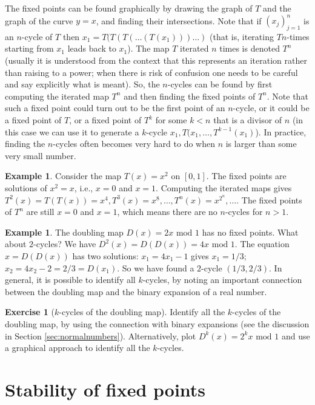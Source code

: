 \documentclass[11pt]{report}
\theoremstyle{plain}
\theoremstyle{definition}
\newtheorem{example}[thm]{Example}
\newtheorem{xexercise}[thm]{Exercise}
\begin{document}
The fixed points can be found graphically by drawing
the graph of $T$ and the graph of the curve $y=x$, and
finding their intersections. Note that if
$(x_j)_{j=1}^n$ is an $n$-cycle of $T$ then
$x_1 = T(T(T(\ldots(T(x_1)))\ldots)$ (that is,
iterating $T$$n$-times starting from $x_1$ leads back
to $x_1$). The map $T$ iterated $n$ times is denoted
$T^n$ (usually it is understood from the context that
this represents an iteration rather than raising to a
power; when there is risk of confusion one needs to be
careful and say explicitly what is meant). So, the
$n$-cycles can be found by first computing the
iterated map $T^n$ and then finding the fixed points
of $T^n$. Note that such a fixed point could turn out
to be the first point of an $n$-cycle, or it could be
a fixed point of $T$, or a fixed point of $T^k$ for
some $k<n$ that is a divisor of $n$ (in this case we
can use it to generate a $k$-cycle
$x_1,T(x_1,\ldots,T^{k-1}(x_1)$). In practice, finding
the $n$-cycles often becomes very hard to do when $n$
is larger than some very small number.

\begin{example}
Consider the map $T(x)=x^2$ on $[0,1]$. The fixed
points are solutions of $x^2=x$, i.e., $x=0$ and
$x=1$. Computing the iterated maps gives
$T^2(x)=T(T(x))=x^4, T^3(x)=x^8, \ldots,
T^n(x)=x^{2^n}, \ldots$.
The fixed points of $T^n$ are still $x=0$ and $x=1$,
which means there are no $n$-cycles for $n>1$.
\end{example}

\begin{example}
The doubling map $D(x)=2x\textrm{ mod }1$ has no fixed
points. What about $2$-cycles? We have
$D^2(x)=D(D(x))=4x\textrm{ mod }1$. The equation
$x=D(D(x))$ has two solutions: $x_1=4x_1-1$ gives
$x_1=1/3$; $x_2=4x_2-2=2/3 = D(x_1)$. So we have found
a $2$-cycle $(1/3,2/3)$. In general, it is possible to
identify all $k$-cycles, by noting an important
connection between the doubling map and the binary
expansion of a real number.
\end{example}

\begin{xexercise}[$k$-cycles of the doubling map]
Identify all the $k$-cycles of the doubling map, by
using the connection with binary expansions (see the
discussion in Section \ref{sec:normalnumbers}).
Alternatively, plot $D^k(x)=2^k x \textrm{ mod }1$ and
use a graphical approach to identify all the
$k$-cycles.
\end{xexercise}

\section{Stability of fixed points}
\end{document}
